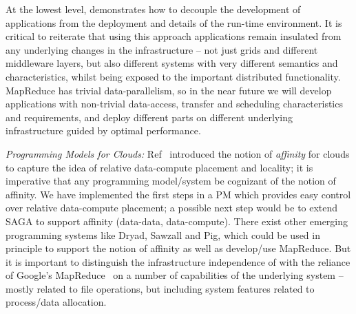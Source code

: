 \documentclass[3p,twocolumn]{elsarticle}
\begin{document}




At the lowest level, \sagamapreduce demonstrates how to decouple the
development of applications from the deployment and details of the
run-time environment.  It is critical to reiterate that using this
approach applications remain insulated from any underlying changes in
the infrastructure -- not just grids and different middleware layers,
but also different systems with very different semantics and
characteristics, whilst being exposed to the important distributed
functionality.  MapReduce has trivial data-parallelism, so in the near
future we will develop applications with non-trivial data-access,
transfer and scheduling characteristics and requirements, and deploy
different parts on different underlying infrastructure guided by
optimal performance.

{\it Programming Models for Clouds: } Ref~\cite{jha_ccpe09} introduced
the notion of {\it affinity} for clouds to capture the idea of
relative data-compute placement and locality; it is imperative that
any programming model/system be cognizant of the notion of
affinity. We have implemented the first steps in a PM which provides
easy control over relative data-compute placement; a possible next
step would be to extend SAGA to support affinity (data-data,
data-compute).  There exist other emerging programming systems like
Dryad, Sawzall and Pig, which could be used in principle to support
the notion of affinity as well as develop/use MapReduce.  But it is
important to distinguish the infrastructure independence of
\sagamapreduce with the reliance of Google's
MapReduce~\cite{mapreduce-paper} on a number of capabilities of the
underlying system -- mostly related to file operations, but including
system features related to process/data allocation.
\end{document}
